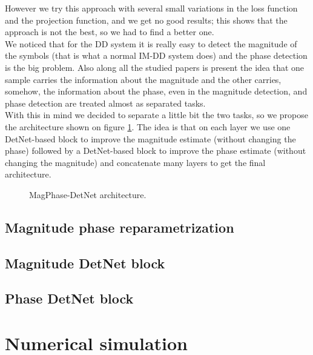 However we try this approach with several small variations in the loss function  and the projection function, and we get no good results; this shows that the approach is not the best, so we had to find a better one.\\

We noticed that for the DD system it is really easy to detect the magnitude of the symbols (that is what a normal IM-DD system does) and the phase detection is the big problem. Also along all the studied papers is present the idea that one sample carries the information about the magnitude and the other carries, somehow, the information about the phase, even in \cite{Secondini} the magnitude detection, and phase detection are treated almost as separated tasks.\\

 With this in mind we decided to separate a little bit the two tasks, so we propose the architecture shown on figure \ref{fig:magPhaseDetNet_architecture}. The idea is that on each layer we use one DetNet-based block to improve  the magnitude estimate (without changing the phase) followed by a DetNet-based block to improve  the phase estimate (without changing the magnitude) and concatenate many layers to get the final architecture.

\begin{figure}[htbp]
\begin{center}
\caption{MagPhase-DetNet architecture.}
\label{fig:magPhaseDetNet_architecture}
\end{center}
\end{figure}


\subsection{Magnitude phase reparametrization}


\subsection{Magnitude DetNet block}


\subsection{Phase DetNet block}







\section{Numerical simulation}

























